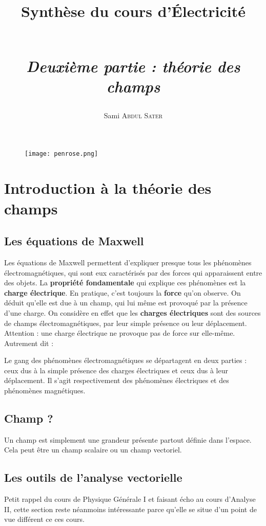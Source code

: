 \documentclass[12pt]{book}
\title{Synthèse du cours d'Électricité \\ \strut \\
\normalsize{\textit{Deuxième partie : théorie des champs}}}
\author{Sami \textsc{Abdul Sater}}
\begin{document}
\begin{titlepage} 


\begin{figure}[h]
\maketitle
    \begin{minipage}[c]{\textwidth}
        \centering
        \begin{center}
        \texttt{[image: penrose.png]}
        \end{center}
        
    \end{minipage}
\end{figure}
\end{titlepage}

\tableofcontents
\chapter{Introduction à la théorie des champs}
\section{Les équations de Maxwell}
Les équations de Maxwell permettent d'expliquer presque tous les phénomènes électromagnétiques, qui sont eux caractérisés par des forces qui apparaissent entre des objets. La \textbf{propriété fondamentale} qui explique ces phénomènes est la \textbf{charge électrique}. En pratique, c'est toujours la \textbf{force} qu'on observe. On déduit qu'elle est due à un champ, qui lui même est provoqué par la présence d'une charge. On considère en effet que les \textbf{charges électriques} sont des sources de champs électromagnétiques, par leur simple présence ou leur déplacement. Attention : une charge électrique ne provoque pas de force sur elle-même. Autrement dit :

Le gang des phénomènes électromagnétiques se départagent en deux parties : ceux dus à la simple présence des charges électriques et ceux dus à leur déplacement. Il s'agit respectivement des phénomènes électriques et des phénomènes magnétiques.
\section{Champ ?}
Un champ est simplement une grandeur présente partout définie dans l'espace. Cela peut être un champ scalaire ou un champ vectoriel.
\section{Les outils de l'analyse vectorielle}
Petit rappel du cours de Physique Générale I et faisant écho au cours d'Analyse II, cette section reste néanmoins intéressante parce qu'elle se situe d'un point de vue différent ce ces cours. \\
\end{document}
